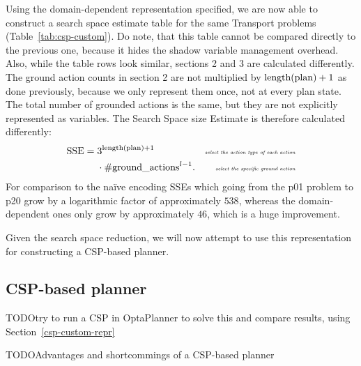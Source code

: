 {Using the domain-dependent representation specified, we are now able to construct
a search space estimate table for the same Transport problems (Table~\ref{tab:csp-custom}). 
Do note, that this table cannot be compared directly to the previous one,
because it hides the shadow variable management overhead.
Also, while the table rows look similar, sections 2 and 3 are calculated
differently. The ground action counts in section 2 are not multiplied by $\textrm{length(plan)} + 1$
as done previously, because we only represent them once, not at every plan state.
The total number of grounded actions is the same, but they are not explicitly represented as variables. The Search Space size Estimate is therefore calculated differently:
\begin{align*}
\textrm{SSE} =\; &3^{\textrm{length(plan)} + 1} & \textit{\tiny select the action type of each action}\\
&\cdot \textrm{\#ground\_actions}^{l-1}. & \textit{\tiny select the specific ground action}
\end{align*}
For comparison to the na{\"{i}}ve encoding SSEs which going from the p01 problem to p20 grow by a logarithmic factor of approximately $538$,
whereas the domain-dependent ones only grow by approximately $46$,
which is a huge improvement.

Given the search space reduction, we will now attempt to use this representation
for constructing a CSP-based planner.

\subsection{CSP-based planner}\label{csp-planner}

TODO{try to run a CSP in OptaPlanner to solve this and compare results, using Section~\ref{csp-custom-repr}}

TODO{Advantages and shortcommings of a CSP-based planner}

}
